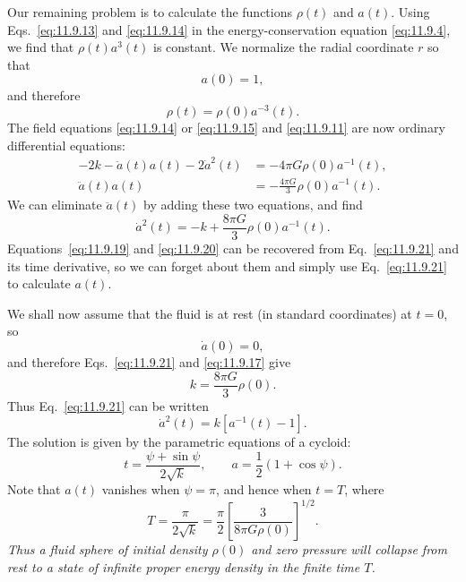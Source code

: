 Our remaining problem is to calculate the functions \(\rho(t)\) and \(a(t)\).
Using Eqs.~\eqref{eq:11.9.13} and \eqref{eq:11.9.14} in the
energy-conservation equation \eqref{eq:11.9.4}, we find that
\(\rho(t)a^3(t)\) is constant. We normalize the radial coordinate \(r\) so
that
\begin{equation}
  a(0)=1,
  \tag{11.9.17}\label{eq:11.9.17}
\end{equation}
and therefore
\begin{equation}
  \rho(t)=\rho(0)a^{-3}(t).
  \tag{11.9.18}\label{eq:11.9.18}
\end{equation}
The field equations \eqref{eq:11.9.14} or \eqref{eq:11.9.15} and
\eqref{eq:11.9.11} are now ordinary differential equations:
\begin{align}
  -2k-\ddot a(t)a(t)-2\dot a^2(t)
  &=-4\pi G\rho(0)a^{-1}(t),
  \tag{11.9.19}\label{eq:11.9.19}\\
  \ddot a(t)a(t)
  &=-\frac{4\pi G}{3}\rho(0)a^{-1}(t).
  \tag{11.9.20}\label{eq:11.9.20}
\end{align}
We can eliminate \(\ddot a(t)\) by adding these two equations, and find
\begin{equation}
  \dot a^2(t)
  =
  -k+\frac{8\pi G}{3}\rho(0)a^{-1}(t).
  \tag{11.9.21}\label{eq:11.9.21}
\end{equation}
Equations~\eqref{eq:11.9.19} and \eqref{eq:11.9.20} can be recovered from
Eq.~\eqref{eq:11.9.21} and its time derivative, so we can forget about them
and simply use Eq.~\eqref{eq:11.9.21} to calculate \(a(t)\).

We shall now assume that the fluid is at rest (in standard coordinates) at
\(t=0\), so
\begin{equation}
  \dot a(0)=0,
  \tag{11.9.22}\label{eq:11.9.22}
\end{equation}
and therefore Eqs.~\eqref{eq:11.9.21} and \eqref{eq:11.9.17} give
\begin{equation}
  k=\frac{8\pi G}{3}\rho(0).
  \tag{11.9.23}\label{eq:11.9.23}
\end{equation}
Thus Eq.~\eqref{eq:11.9.21} can be written
\begin{equation}
  \dot a^2(t)=k[a^{-1}(t)-1].
  \tag{11.9.24}\label{eq:11.9.24}
\end{equation}
The solution is given by the parametric equations of a cycloid:
\begin{equation}
  t=\frac{\psi+\sin\psi}{2\sqrt k},
  \qquad
  a=\frac12(1+\cos\psi).
  \tag{11.9.25}\label{eq:11.9.25}
\end{equation}
Note that \(a(t)\) vanishes when \(\psi=\pi\), and hence when \(t=T\), where
\begin{equation}
  T=\frac{\pi}{2\sqrt k}
  =\frac{\pi}{2}
   \left[\frac{3}{8\pi G\rho(0)}\right]^{1/2}.
  \tag{11.9.26}\label{eq:11.9.26}
\end{equation}
\emph{Thus a fluid sphere of initial density \(\rho(0)\) and zero pressure
will collapse from rest to a state of infinite proper energy density in the
finite time \(T\).}

